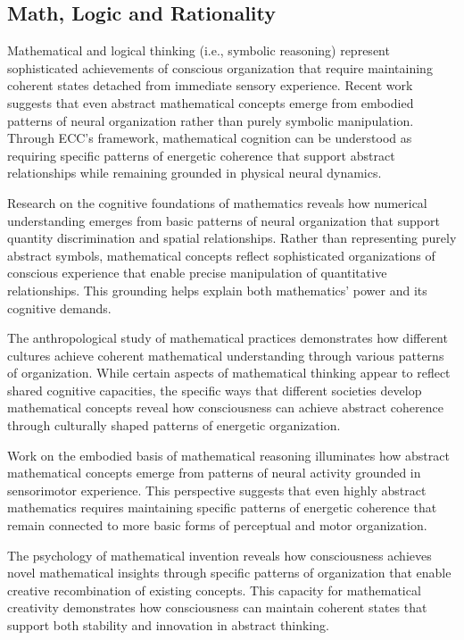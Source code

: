 \begin{refsection}
\section{Math, Logic and Rationality}

Mathematical and logical thinking (i.e., symbolic reasoning) represent sophisticated achievements of conscious organization that require maintaining coherent states detached from immediate sensory experience. Recent work \cite{Lakoff2000} suggests that even abstract mathematical concepts emerge from embodied patterns of neural organization rather than purely symbolic manipulation. Through ECC's framework, mathematical cognition can be understood as requiring specific patterns of energetic coherence that support abstract relationships while remaining grounded in physical neural dynamics.

Research on the cognitive foundations of mathematics \cite{Dehaene2011b} reveals how numerical understanding emerges from basic patterns of neural organization that support quantity discrimination and spatial relationships. Rather than representing purely abstract symbols, mathematical concepts reflect sophisticated organizations of conscious experience that enable precise manipulation of quantitative relationships. This grounding helps explain both mathematics' power and its cognitive demands.

The anthropological study of mathematical practices \cite{Ascher1991} demonstrates how different cultures achieve coherent mathematical understanding through various patterns of organization. While certain aspects of mathematical thinking appear to reflect shared cognitive capacities, the specific ways that different societies develop mathematical concepts reveal how consciousness can achieve abstract coherence through culturally shaped patterns of energetic organization.

Work on the embodied basis of mathematical reasoning \cite{Lakoff2000} illuminates how abstract mathematical concepts emerge from patterns of neural activity grounded in sensorimotor experience. This perspective suggests that even highly abstract mathematics requires maintaining specific patterns of energetic coherence that remain connected to more basic forms of perceptual and motor organization.

The psychology of mathematical invention \cite{Hadamard1945} reveals how consciousness achieves novel mathematical insights through specific patterns of organization that enable creative recombination of existing concepts. This capacity for mathematical creativity demonstrates how consciousness can maintain coherent states that support both stability and innovation in abstract thinking.


\end{refsection}
